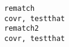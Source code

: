 \documentclass[
  letterpaper,
  DIV=11,
  numbers=noendperiod]{scrreprt}
\begin{document}
\begin{verbatim}
rematch                                                                                                                                                                                                                                                                                                                                                                                                                                                                                                                                                                                                                                                                                                                                                                                                                                                                                                                                                                                                                                                                                                                                                                                                                                                                                        covr, testthat
rematch2                                                                                                                                                                                                                                                                                                                                                                                                                                                                                                                                                                                                                                                                                                                                                                                                                                                                                                                                                                                                                                                                                                                                                                                                                                                                                       covr, testthat

\end{verbatim}
\end{document}

